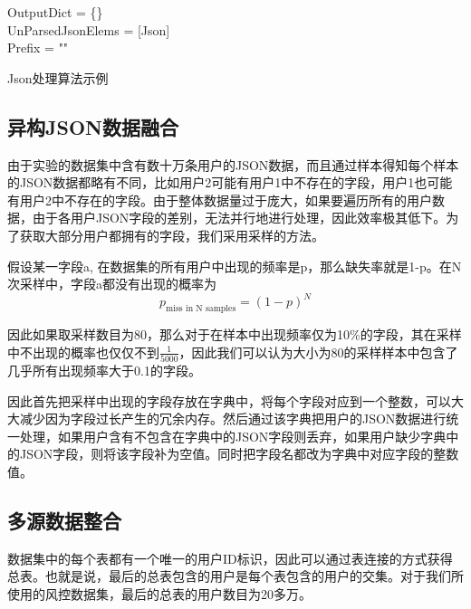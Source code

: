 \begin{algorithm}[htbp]
	\SetAlgoLined
	OutputDict = \{\}\\
	UnParsedJsonElems = [Json]\\
	Prefix = ""\\
	\caption{Json处理算法示例}
	\label{algo:json}
\end{algorithm}
\subsection{异构JSON数据融合}
由于实验的数据集中含有数十万条用户的JSON数据，而且通过样本得知每个样本的JSON数据都略有不同，比如用户2可能有用户1中不存在的字段，用户1也可能有用户2中不存在的字段。由于整体数据量过于庞大，如果要遍历所有的用户数据，由于各用户JSON字段的差别，无法并行地进行处理，因此效率极其低下。为了获取大部分用户都拥有的字段，我们采用采样的方法。

假设某一字段a, 在数据集的所有用户中出现的频率是p，那么缺失率就是1-p。在N次采样中，字段a都没有出现的概率为
\[ p_{\text{miss in N samples}} = (1-p)^N\]

因此如果取采样数目为80，那么对于在样本中出现频率仅为10\%的字段，其在采样中不出现的概率也仅仅不到$\frac{1}{5000}$，因此我们可以认为大小为80的采样样本中包含了几乎所有出现频率大于0.1的字段。

因此首先把采样中出现的字段存放在字典中，将每个字段对应到一个整数，可以大大减少因为字段过长产生的冗余内存。然后通过该字典把用户的JSON数据进行统一处理，如果用户含有不包含在字典中的JSON字段则丢弃，如果用户缺少字典中的JSON字段，则将该字段补为空值。同时把字段名都改为字典中对应字段的整数值。

\subsection{多源数据整合}
数据集中的每个表都有一个唯一的用户ID标识，因此可以通过表连接的方式获得总表。也就是说，最后的总表包含的用户是每个表包含的用户的交集。对于我们所使用的风控数据集，最后的总表的用户数目为20多万。

